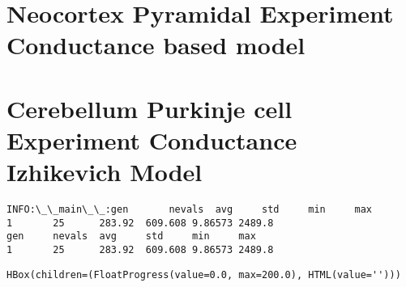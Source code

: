 \documentclass[11pt]{article}
\begin{document}
    \hypertarget{neocortex-pyramidal-experiment-conductance-based-model}{%
\section{Neocortex Pyramidal Experiment Conductance based
model}\label{neocortex-pyramidal-experiment-conductance-based-model}}

    \hypertarget{cerebellum-purkinje-cell-experiment-conductance-izhikevich-model}{%
\section{Cerebellum Purkinje cell Experiment Conductance Izhikevich
Model}\label{cerebellum-purkinje-cell-experiment-conductance-izhikevich-model}}

    \begin{Verbatim}[commandchars=\\\{\}]
INFO:\_\_main\_\_:gen       nevals  avg     std     min     max
1       25      283.92  609.608 9.86573 2489.8
gen     nevals  avg     std     min     max
1       25      283.92  609.608 9.86573 2489.8
    \end{Verbatim}

    
    \begin{verbatim}
HBox(children=(FloatProgress(value=0.0, max=200.0), HTML(value='')))
    \end{verbatim}
\end{document}

